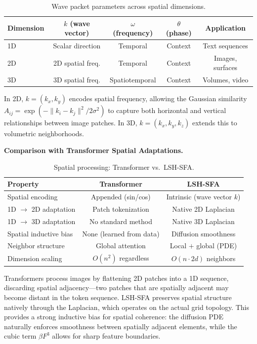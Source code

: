 \documentclass{article}
\begin{document}
\begin{table}[h]
\centering
\caption{Wave packet parameters across spatial dimensions.}
\label{tab:wave_packet_dims}
\begin{tabular}{lcccc}
\toprule
\textbf{Dimension} & $k$ (wave vector) & $\omega$ (frequency) & $\theta$ (phase) & \textbf{Application} \\
\midrule
1D & Scalar direction & Temporal & Context & Text sequences \\
2D & 2D spatial freq. & Temporal & Context & Images, surfaces \\
3D & 3D spatial freq. & Spatiotemporal & Context & Volumes, video \\
\bottomrule
\end{tabular}
\end{table}

In 2D, $k = (k_x, k_y)$ encodes spatial frequency, allowing the Gaussian similarity $A_{ij} = \exp(-\|k_i - k_j\|^2 / 2\sigma^2)$ to capture both horizontal and vertical relationships between image patches. In 3D, $k = (k_x, k_y, k_z)$ extends this to volumetric neighborhoods.

\textbf{Comparison with Transformer Spatial Adaptations.}

\begin{table}[h]
\centering
\caption{Spatial processing: Transformer vs.\ LSH-SFA.}
\label{tab:spatial_comparison}
\begin{tabular}{lcc}
\toprule
\textbf{Property} & \textbf{Transformer} & \textbf{LSH-SFA} \\
\midrule
Spatial encoding & Appended (sin/cos) & Intrinsic (wave vector $k$) \\
1D $\to$ 2D adaptation & Patch tokenization & Native 2D Laplacian \\
1D $\to$ 3D adaptation & No standard method & Native 3D Laplacian \\
Spatial inductive bias & None (learned from data) & Diffusion smoothness \\
Neighbor structure & Global attention & Local $+$ global (PDE) \\
Dimension scaling & $O(n^2)$ regardless & $O(n \cdot 2d)$ neighbors \\
\bottomrule
\end{tabular}
\end{table}

Transformers process images by flattening 2D patches into a 1D sequence, discarding spatial adjacency---two patches that are spatially adjacent may become distant in the token sequence. LSH-SFA preserves spatial structure natively through the Laplacian, which operates on the actual grid topology. This provides a strong inductive bias for spatial coherence: the diffusion PDE naturally enforces smoothness between spatially adjacent elements, while the cubic term $\beta F^3$ allows for sharp feature boundaries.
\end{document}
